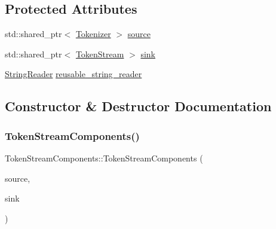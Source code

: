 \subsection*{Protected Attributes}
\begin{DoxyCompactItemize}
\item 
std\+::shared\+\_\+ptr$<$ \mbox{\hyperlink{classlucene_1_1core_1_1analysis_1_1Tokenizer}{Tokenizer}} $>$ \mbox{\hyperlink{classlucene_1_1core_1_1analysis_1_1TokenStreamComponents_ac09c35c45936a9f41350192482ede611}{source}}
\item 
std\+::shared\+\_\+ptr$<$ \mbox{\hyperlink{classlucene_1_1core_1_1analysis_1_1TokenStream}{Token\+Stream}} $>$ \mbox{\hyperlink{classlucene_1_1core_1_1analysis_1_1TokenStreamComponents_aae5ab75dd537f593a47f8d9c3f4113d5}{sink}}
\item 
\mbox{\hyperlink{classlucene_1_1core_1_1analysis_1_1StringReader}{String\+Reader}} \mbox{\hyperlink{classlucene_1_1core_1_1analysis_1_1TokenStreamComponents_a8e18d9abaaaa2ecbacc2167d0347aad1}{reusable\+\_\+string\+\_\+reader}}
\end{DoxyCompactItemize}


\subsection{Constructor \& Destructor Documentation}
\mbox{\label{classlucene_1_1core_1_1analysis_1_1TokenStreamComponents_ab911fac1d236284928d565686b00a1e9}} 
\subsubsection{\texorpdfstring{Token\+Stream\+Components()}{TokenStreamComponents()}\hspace{0.1cm}{\footnotesize\ttfamily [1/2]}}
{\footnotesize\ttfamily Token\+Stream\+Components\+::\+Token\+Stream\+Components (\begin{DoxyParamCaption}\item[{std\+::shared\+\_\+ptr$<$ \mbox{\hyperlink{classlucene_1_1core_1_1analysis_1_1Tokenizer}{Tokenizer}} $>$}]{source,  }\item[{std\+::shared\+\_\+ptr$<$ \mbox{\hyperlink{classlucene_1_1core_1_1analysis_1_1TokenStream}{Token\+Stream}} $>$}]{sink }\end{DoxyParamCaption})}

